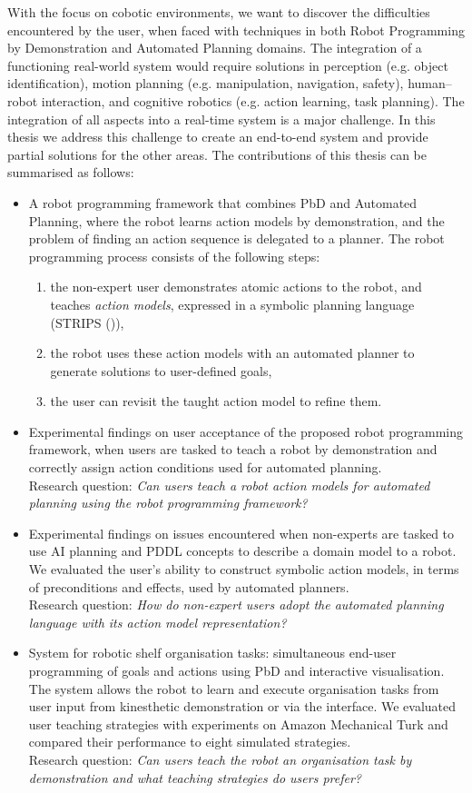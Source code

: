 With the focus on cobotic environments, we want to discover the difficulties encountered by the user, when faced with techniques in both Robot Programming by Demonstration and Automated Planning domains. 
The integration of a functioning real-world system would require solutions in perception (e.g. object identification), motion planning (e.g. manipulation, navigation, safety), human–robot interaction, and cognitive robotics (e.g. action learning, task planning). 
The integration of all aspects into a real-time system is a major challenge.
In this thesis we address this challenge to create an end-to-end system and provide partial solutions for the other areas.
The contributions of this thesis can be summarised as follows:
\begin{itemize}
	\item {A robot programming framework that combines PbD and Automated Planning, where the robot learns action models by demonstration, and the problem of finding an action sequence is delegated to a planner.
	The robot programming process consists of the following steps:
	\begin{enumerate}
		\item the non-expert user demonstrates atomic actions to the robot, and teaches \textit{action models}, expressed in a symbolic planning language (STRIPS (\cite{fikes1971strips})),
		\item the robot uses these action models with an automated planner to generate solutions to user-defined goals,
		\item the user can revisit the taught action model to refine them.
	\end{enumerate}}
    \item {Experimental findings on user acceptance of the proposed robot programming framework, when users are tasked to teach a robot by demonstration and correctly assign action conditions used for automated planning. \\
    Research question: \textit{Can users teach a robot action models for automated planning using the robot programming framework?}}
    \item {Experimental findings on issues encountered when non-experts are tasked to use AI planning and PDDL concepts to describe a domain model to a robot. 
    We evaluated the user's ability to construct symbolic action models, in terms of preconditions and effects, used by automated planners.\\ 
    Research question: \textit{How do non-expert users adopt the automated planning language with its action model representation?}}
    \item {System for robotic shelf organisation tasks: simultaneous end-user programming of goals and actions using PbD and interactive visualisation.
    The system allows the robot to learn and execute organisation tasks from user input from kinesthetic demonstration or via the interface.
    We evaluated user teaching strategies with experiments on Amazon Mechanical Turk and compared their performance to eight simulated strategies.\\ 
    Research question: \textit{Can users teach the robot an organisation task by demonstration and what teaching strategies do users prefer?}}
\end{itemize}
